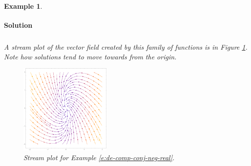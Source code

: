 \documentclass[letterpaper, 11pt, openany]{book}
\theoremstyle{mytheoremstyle}
\theoremstyle{myexamplestyle}
\newtheorem{example}{Example}[section]
\newenvironment{solution}{\paragraph{\sffamily \smaller \fontseries{b}\selectfont Solution}}{\hfill\faSquare}
\begin{document}
\begin{example}
\begin{solution}
\begin{align*}
        \end{align*}
        A stream plot of the vector field created by this family of functions is in Figure \ref{f:de-comp-conj-neg-real}. Note how solutions tend to move towards from the origin.
        \begin{figure}[htbp]
            \centering
                \includegraphics[width=0.4\textwidth]{Figures/de-stream-complex-neg-re.pdf}
            \caption{Stream plot for Example \ref{e:de-comp-conj-neg-real}.}
            \label{f:de-comp-conj-neg-real}
        \end{figure}
    \end{solution}
\end{example}
\end{document}
